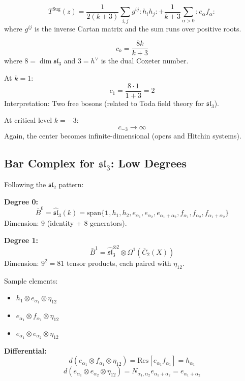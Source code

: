 \begin{construction}
$$T^{\text{Sug}}(z) = \frac{1}{2(k+3)} \sum_{i,j} g^{ij} : h_i h_j : + \frac{1}{k+3} \sum_{\alpha > 0} : e_{\alpha} f_{\alpha} :$$
where $g^{ij}$ is the inverse Cartan matrix and the sum runs over positive roots.
\end{construction}

\begin{theorem}
$$c_k = \frac{8k}{k+3}$$
where $8 = \dim \mathfrak{sl}_3$ and $3 = h^\vee$ is the dual Coxeter number.
\end{theorem}

\begin{computation}
At $k=1$:
$$c_1 = \frac{8 \cdot 1}{1+3} = 2$$
Interpretation: Two free bosons (related to Toda field theory for $\mathfrak{sl}_3$).

At critical level $k = -3$:
$$c_{-3} \to \infty$$
Again, the center becomes infinite-dimensional (opers and Hitchin systems).
\end{computation}

\subsection{Bar Complex for $\mathfrak{sl}_3$: Low Degrees}

\begin{construction}
Following the $\mathfrak{sl}_2$ pattern:

\textbf{Degree 0:} 
$$\bar{B}^0 = \widehat{\mathfrak{sl}}_3(k) = \text{span}\{\mathbf{1}, h_1, h_2, e_{\alpha_1}, e_{\alpha_2}, e_{\alpha_1+\alpha_2}, f_{\alpha_1}, f_{\alpha_2}, f_{\alpha_1+\alpha_2}\}$$
Dimension: $9$ (identity + $8$ generators).

\textbf{Degree 1:}
$$\bar{B}^1 = \widehat{\mathfrak{sl}}_3^{\otimes 2} \otimes \Omega^1(\overline{C}_2(X))$$
Dimension: $9^2 = 81$ tensor products, each paired with $\eta_{12}$.

Sample elements:
\begin{itemize}
\item $h_1 \otimes e_{\alpha_1} \otimes \eta_{12}$
\item $e_{\alpha_1} \otimes f_{\alpha_1} \otimes \eta_{12}$
\item $e_{\alpha_1} \otimes e_{\alpha_2} \otimes \eta_{12}$
\end{itemize}

\textbf{Differential:}
$$d(e_{\alpha_1} \otimes f_{\alpha_1} \otimes \eta_{12}) = \text{Res}[e_{\alpha_1} f_{\alpha_1}] = h_{\alpha_1}$$
$$d(e_{\alpha_1} \otimes e_{\alpha_2} \otimes \eta_{12}) = N_{\alpha_1,\alpha_2} e_{\alpha_1+\alpha_2} = e_{\alpha_1+\alpha_2}$$
\end{construction}

